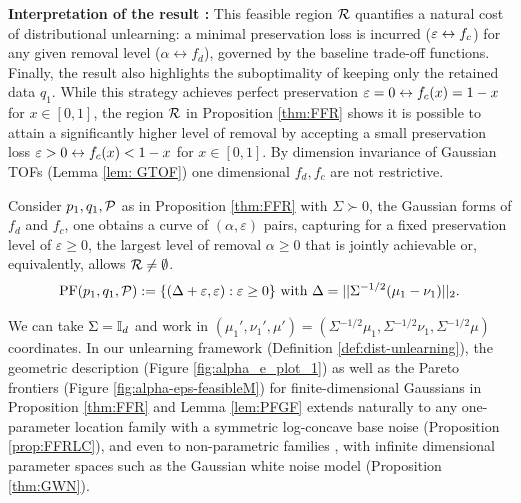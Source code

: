 \textbf{Interpretation of the result :} This feasible region $\mathcal{R}$ quantifies a natural cost of distributional unlearning: a minimal preservation loss is incurred  ($\varepsilon \leftrightarrow f_c$) for any given removal level ($\alpha \leftrightarrow f_d$), governed by the baseline trade-off functions.  Finally, the result also highlights the suboptimality of keeping only the retained data $q_1$. While this strategy achieves perfect preservation $\varepsilon = 0 \leftrightarrow f_c(x) = 1-x$  for $x \in [0,1]$, the region $\mathcal{R}$ in Proposition \ref{thm:FFR} shows it is possible to attain a significantly higher level of removal by accepting a  small preservation loss $\varepsilon >0 \leftrightarrow f_c(x) < 1- x$ for $x \in [0,1]$. By dimension invariance of Gaussian TOFs (Lemma \ref{lem: GTOF}) one dimensional $f_d,f_c$ are not restrictive.
\vspace{-1mm}
\begin{lemma} \label{lem:PFGF}
Consider $p_1, q_1, \mathcal{P}$  as in Proposition \ref{thm:FFR}  with $\Sigma \succ 0$, the Gaussian forms of $f_d$ and $f_c$, one obtains a curve of $(\alpha, \varepsilon)$ pairs, capturing for a fixed preservation level of $\varepsilon \geq 0$, the largest level of removal $\alpha \geq 0$  that is jointly achievable or, equivalently, allows $\mathcal{R} \neq \emptyset$.
\begin{equation} \label{eq:Pareto}
    \text{PF}(p_1, q_1, \mathcal{P}) := \{(\Delta +\varepsilon, \varepsilon): \varepsilon \geq 0\} \text{ with } \Delta = ||\Sigma^{-1/2}(\mu_1- \nu_1)||_2.
\end{equation}
\end{lemma}
\begin{remark} We can take $\Sigma= \mathbb{I}_d$ and work in $(\mu_1', \nu_1', \mu')= (\Sigma{^{-1/2} \mu_1}, \Sigma{^{-1/2} \nu_1}, \Sigma{^{-1/2} \mu})$  coordinates. In our unlearning framework (Definition \ref{def:dist-unlearning}), the geometric description (Figure \ref{fig:alpha_e_plot_1}) as well as the Pareto frontiers (Figure \ref{fig:alpha-eps-feasibleM}) for finite-dimensional Gaussians in Proposition \ref{thm:FFR} and Lemma \ref{lem:PFGF} extends naturally to any one-parameter location family with a symmetric log-concave base noise (Proposition \ref{prop:FFRLC}), and even to non-parametric families \citep{gine2016mathematical}, \citep{castillo2024bayesian} with infinite dimensional parameter spaces such as the  Gaussian white noise model (Proposition \ref{thm:GWN}). 
\end{remark}
\vspace{-3mm}
